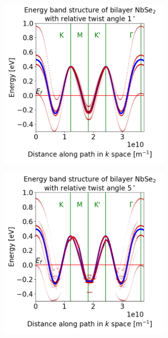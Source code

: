 \documentclass[12pt]{report} %
\begin{document}
\begin{figure}[t]
\centering
  \begin{subfigure}[b]{0.475\textwidth}
    \centering
    \includegraphics[width=0.95\textwidth]{1_deg_0.1_coupling.png}
    \caption{}
    \label{bilayer_rotation_1}
  \end{subfigure}
  \hfill
  \begin{subfigure}[b]{0.475\textwidth}
    \centering
    \includegraphics[width=0.95\textwidth]{5_deg_0.1_coupling.png}

\end{subfigure}
\end{figure}
\end{document}
